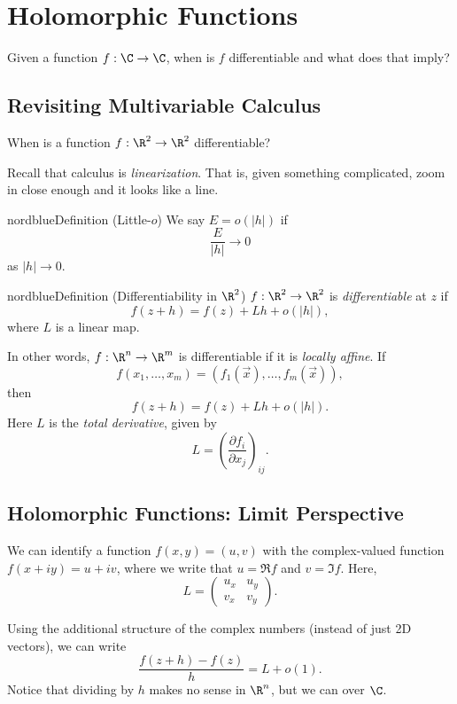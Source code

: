 \chapter{Holomorphic Functions}

Given a function $f : \C \to \C$, when is $f$
differentiable and what does that imply?

\section{Revisiting Multivariable Calculus}
When is a function $f : \R^2 \to \R^2$ differentiable?

Recall that calculus is \textit{linearization}. That is,
given something complicated, zoom in close enough and
it looks like a line.

\begin{mybox}{nordblue}{Definition (Little-$o$)}
  We say $E = o(|h|)$ if
  \[\frac{E}{|h|} \to 0\]
  as $|h| \to 0$.
\end{mybox}

\begin{mybox}{nordblue}{Definition (Differentiability in $\R^2$)}
  $f : \R^2 \to \R^2$ is \textit{differentiable} at
  $z$ if
  \[f(z + h) = f(z) + Lh + o(|h|),\]
  where $L$ is a linear map.
\end{mybox}

In other words, $f : \R^n \to \R^m$ is differentiable if
it is \textit{locally affine}. If
\[
f(x_1, \dots, x_m) = (f_1(\vec{x}), \dots, f_m(\vec{x}))
,\]
then
\[
f(z + h) = f(z) + Lh + o(|h|)
.\] 
Here $L$ is the \textit{total derivative}, given by
\[
  L = \left(\frac{\partial f_i}{\partial x_j}\right)_{ij}
.\]

\section{Holomorphic Functions: Limit Perspective}
We can identify a function $f(x, y) = (u, v)$ with
the complex-valued function $f(x + iy) = u + iv$, where
we write that $u = \Re f$ and $v = \Im f$. Here,
\[
L =
\left(\begin{matrix}
  u_x & u_y \\
  v_x & v_y
\end{matrix}\right)
.\] 

Using the additional structure of the complex numbers
(instead of just 2D vectors), we can write
\[\frac{f(z + h) - f(z)}{h} = L + o(1).\]
Notice that dividing by $h$ makes no sense in $\R^n$, but
we can over $\C$.

